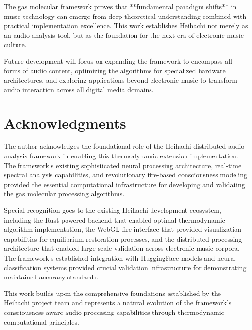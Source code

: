 \documentclass[12pt,a4paper]{article}
\begin{document}
The gas molecular framework proves that **fundamental paradigm shifts** in music technology can emerge from deep theoretical understanding combined with practical implementation excellence. This work establishes Heihachi not merely as an audio analysis tool, but as the foundation for the next era of electronic music culture.

Future development will focus on expanding the framework to encompass all forms of audio content, optimizing the algorithms for specialized hardware architectures, and exploring applications beyond electronic music to transform audio interaction across all digital media domains.

\section*{Acknowledgments}

The author acknowledges the foundational role of the Heihachi distributed audio analysis framework in enabling this thermodynamic extension implementation. The framework's existing sophisticated neural processing architecture, real-time spectral analysis capabilities, and revolutionary fire-based consciousness modeling provided the essential computational infrastructure for developing and validating the gas molecular processing algorithms.

Special recognition goes to the existing Heihachi development ecosystem, including the Rust-powered backend that enabled optimal thermodynamic algorithm implementation, the WebGL fire interface that provided visualization capabilities for equilibrium restoration processes, and the distributed processing architecture that enabled large-scale validation across electronic music corpora. The framework's established integration with HuggingFace models and neural classification systems provided crucial validation infrastructure for demonstrating maintained accuracy standards.

This work builds upon the comprehensive foundations established by the Heihachi project team and represents a natural evolution of the framework's consciousness-aware audio processing capabilities through thermodynamic computational principles.



\end{document}
